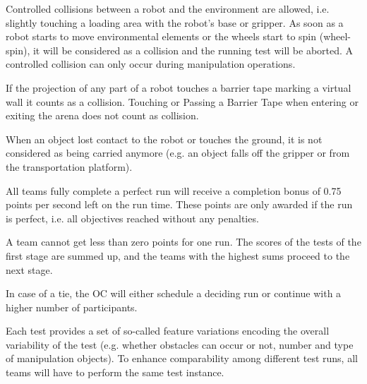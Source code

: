 Controlled collisions between a robot and the environment are allowed, i.e. slightly touching a loading area with the robot's base or gripper. As soon as a robot starts to move environmental elements or the wheels start to spin (wheel-spin), it will be considered as a collision and the running test will be aborted. A controlled collision can only occur during manipulation operations.
\par
If the projection of any part of a robot touches a barrier tape marking a virtual wall it counts as a collision. Touching or Passing a Barrier Tape when entering or exiting the arena does not count as collision.
\par
When an object lost contact to the robot or touches the ground, it is not considered as being carried anymore (e.g. an object falls off the gripper or from the transportation platform).
\par
All teams fully complete a perfect run will receive a completion bonus of 0.75 points per second left on the run time. These points are only awarded if the run is perfect, i.e. all objectives reached without any penalties.
\par
A team cannot get less than zero points for one run. 
The scores of the tests of the first stage are summed up, and the teams with the highest sums proceed to the next stage.
\par
In case of a tie, the OC will either schedule a deciding run or continue with a higher number of participants.
\par
\par

Each test provides a set of so-called feature variations encoding the overall variability of the test (e.g. whether obstacles can occur or not, number and type of manipulation objects). To enhance comparability among different test runs, all teams will have to perform the same test instance.


